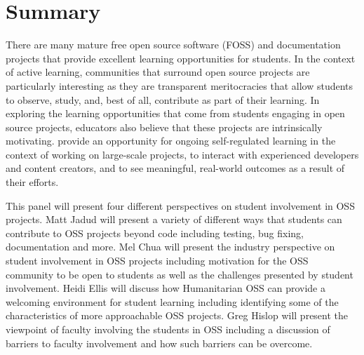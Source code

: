 \documentclass{sig-alternate}
\begin{document}
                
\maketitle



\section{Summary}
There are many mature free open source software (FOSS) and documentation projects that provide excellent learning opportunities for students.  In the context of active learning, communities that surround open source projects are particularly interesting as they are transparent meritocracies that allow students to observe, study, and, best of all, contribute as part of their learning.  In exploring the learning opportunities that come from students engaging in open source projects, educators also believe that these projects are intrinsically motivating.%
provide an opportunity for ongoing self-regulated learning in the context of working on large-scale projects,%
to interact with experienced developers and content creators, and to see meaningful, real-world outcomes as a result of their efforts.

This panel will present four different perspectives on student involvement in OSS projects. Matt Jadud will present a variety of different ways that students can contribute to OSS projects beyond code including  testing, bug fixing, documentation and more. Mel Chua will present the industry perspective on student involvement in OSS projects including motivation for the OSS community to be open to students as well as the challenges presented by student involvement. Heidi Ellis will discuss how Humanitarian OSS can provide a welcoming environment for student learning including identifying some of the characteristics of more approachable OSS projects. Greg Hislop will present the viewpoint of faculty involving the students in OSS including a discussion of barriers to faculty involvement and how such barriers can be overcome. 
\end{document}
